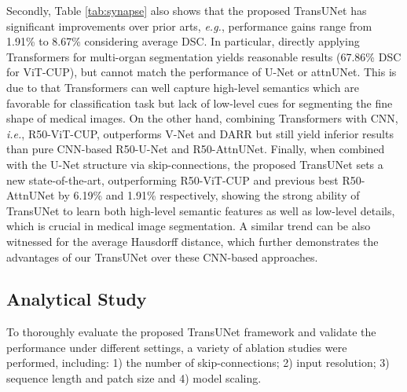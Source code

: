\documentclass[runningheads]{llncs}
\begin{document}
Secondly, Table \ref{tab:synapse} also shows that the proposed TransUNet has significant improvements over prior arts, \emph{e.g.}, performance gains range from 1.91\% to 8.67\% considering average DSC. 
In particular, directly applying Transformers for multi-organ segmentation yields reasonable results (67.86\% DSC for ViT-CUP), but cannot match the performance of U-Net or attnUNet. 
This is due to that Transformers can well capture high-level semantics which are favorable for classification task but lack of low-level cues for segmenting the fine shape of medical images. 
On the other hand, combining Transformers with CNN, \emph{i.e.}, R50-ViT-CUP, outperforms V-Net and DARR but still yield inferior results than pure CNN-based R50-U-Net and R50-AttnUNet. Finally, when combined with the U-Net structure via skip-connections, the proposed TransUNet sets a new state-of-the-art, outperforming R50-ViT-CUP and previous best R50-AttnUNet by 6.19\% and 1.91\% respectively, showing the strong ability of TransUNet to learn both high-level semantic features as well as low-level details, which is crucial in medical image segmentation.
A similar trend can be also witnessed for the average Hausdorff distance, which further demonstrates the advantages of our TransUNet over these CNN-based approaches.


\subsection{Analytical Study}
\label{sec:analytical}
To thoroughly evaluate the proposed TransUNet framework and validate the performance under different settings, a variety of ablation studies were performed, including: 1) the number of skip-connections; 2) input resolution; 3) sequence length and patch size and 4) model scaling.
\end{document}
